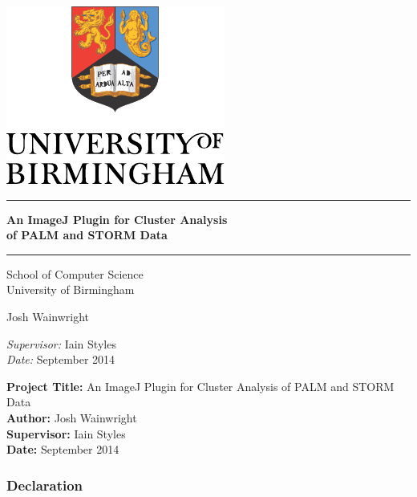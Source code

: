 
\begin{titlepage}
	\begin{center}
		\vspace*{\fill}

		\centering
		\includegraphics[scale=1.3]{Logo.pdf}
		\vfill

		\hrule
		{\LARGE\bf An ImageJ Plugin for Cluster Analysis \\
		of PALM and STORM Data\\[0.4cm]}
		\hrule

		\vfill
		\large
		School of Computer Science\\
		University of Birmingham

		\vfill
		Josh Wainwright
		\vfill

		\vfill
		\textit{Supervisor:} Iain Styles \\
		\vfill
		\textit{Date:} September 2014
		\vfill
		\vfill

	\end{center}
\end{titlepage}
\restoregeometry%

\thispagestyle{empty}

\textbf{Project Title:} An ImageJ Plugin for Cluster Analysis of PALM and STORM Data \\
\textbf{Author:} Josh Wainwright \\
\textbf{Supervisor:} Iain Styles \\
\textbf{Date:} September 2014 \\
\textbf{}
\vfill
\vfill

\subsubsection*{Declaration}

